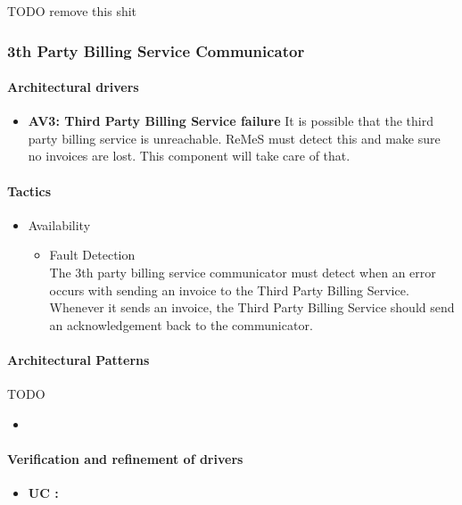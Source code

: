 TODO remove this shit
\subsubsection{3th Party Billing Service Communicator}
\paragraph{Architectural drivers}
\begin{itemize}
	\item \textbf{AV3: Third Party Billing Service failure}
	It is possible that the third party billing service is unreachable. ReMeS
		must detect this and make sure no invoices are lost. This component will
		take care of that.
\end{itemize}


\paragraph{Tactics}
\begin{itemize}
	\item Availability
	\begin{itemize}
		\item Fault Detection\\
		The 3th party billing service communicator must detect when an error occurs with sending an invoice to the Third
			Party Billing Service. Whenever it sends an invoice, the Third Party
			Billing Service should send an acknowledgement back to the communicator.
	\end{itemize}
\end{itemize}


\paragraph{Architectural Patterns}
TODO
\begin{itemize}
	\item{}
\end{itemize}


\paragraph{Verification and refinement of drivers}
\textbf{}
\begin{itemize}
	\item \textbf{UC : }
\end{itemize}
